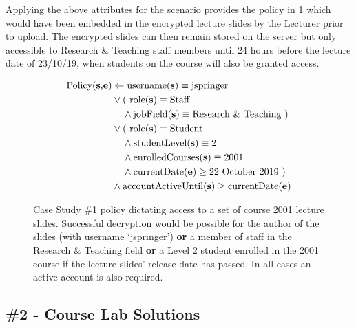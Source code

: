 Applying the above attributes for the scenario provides the policy in \cref{fig:case_study_policy_1} which would have been embedded in the encrypted lecture slides by the Lecturer prior to upload. The encrypted slides can then remain stored on the server but only accessible to Research \& Teaching staff members until 24 hours before the lecture date of 23/10/19, when students on the course will also be granted access.

\begin{figure}[ht]
  \centering
\begin{align*}
  \text{Policy(\textbf{s},\textbf{e})}
  &
    \leftarrow
    \text{username(\textbf{s})} \equiv \text{jspringer}
  \\
  &
    \vee
    \text{( role(\textbf{s})} \equiv \text{Staff}
  \\
  &
    \phantom{::}\phantom{::}\wedge
    \text{jobField(\textbf{s})} \equiv \text{Research \& Teaching )}
  \\
  &
    \vee
    \text{( role(\textbf{s})} \equiv \text{Student}
  \\
  &
    \phantom{::}\phantom{::}\wedge
    \text{studentLevel(\textbf{s})} \equiv \text{2}
  \\
  &
    \phantom{::}\phantom{::}\wedge
    \text{enrolledCourses(\textbf{s})} \equiv \text{2001}
  \\
  &
    \phantom{::}\phantom{::}\wedge
    \text{currentDate(\textbf{e})} \geq \text{22 October 2019 )}
  \\
  &
    \wedge
    \text{accountActiveUntil(\textbf{s})} \geq \text{currentDate(\textbf{e})}
\end{align*}
  \caption{
    \label{fig:case_study_policy_1}
    Case Study \#1 policy dictating access to a set of course 2001 lecture slides.
    Successful decryption would be possible for the author of the slides (with username `jspringer') \textbf{or} a member of staff in the Research \& Teaching field \textbf{or} a Level 2 student enrolled in the 2001 course if the lecture slides' release date has passed. In all cases an active account is also required.
  }
\end{figure}

\subsection{\#2 - Course Lab Solutions}
\label{subsec:analysis_case_studies_2}

